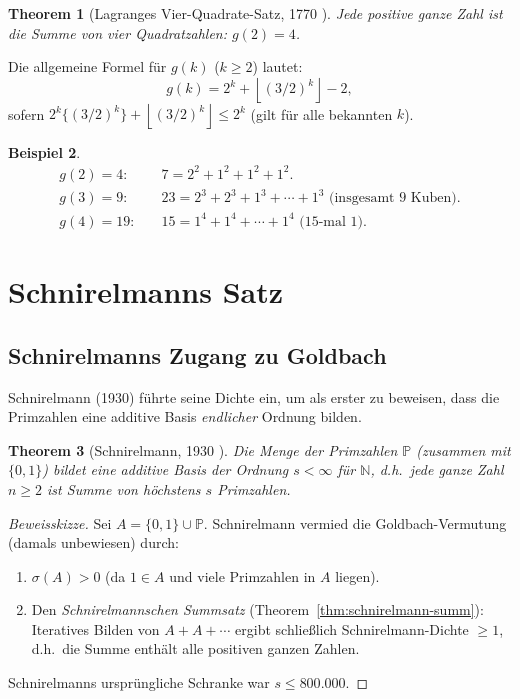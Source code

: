 \documentclass[12pt,a4paper]{amsart}
\newtheorem{theorem}{Theorem}[section]
\theoremstyle{definition}
\newtheorem{beispiel}[theorem]{Beispiel}
\newcommand{\N}{\mathbb{N}}
\newcommand{\floor}[1]{\left\lfloor #1 \right\rfloor}
\begin{document}
\begin{theorem}[Lagranges Vier-Quadrate-Satz, 1770 \cite{Lagrange1770}]
Jede positive ganze Zahl ist die Summe von vier Quadratzahlen:
$g(2) = 4$.
\end{theorem}

Die allgemeine Formel f\"{u}r $g(k)$ ($k \geq 2$) lautet:
\[
  g(k) = 2^k + \floor{(3/2)^k} - 2,
\]
sofern $2^k\{(3/2)^k\} + \floor{(3/2)^k} \leq 2^k$
(gilt f\"{u}r alle bekannten $k$).

\begin{beispiel}
\begin{align*}
  g(2) = 4: &\quad 7 = 2^2 + 1^2 + 1^2 + 1^2. \\
  g(3) = 9: &\quad 23 = 2^3 + 2^3 + 1^3 + \cdots + 1^3
                       \text{ (insgesamt 9 Kuben)}. \\
  g(4) = 19: &\quad 15 = 1^4 + 1^4 + \cdots + 1^4
                        \text{ (15-mal 1)}.
\end{align*}
\end{beispiel}

\section{Schnirelmanns Satz}\label{sec:schnirelmann}

\subsection{Schnirelmanns Zugang zu Goldbach}

Schnirelmann (1930) f\"{u}hrte seine Dichte ein, um als erster zu
beweisen, dass die Primzahlen eine additive Basis \emph{endlicher}
Ordnung bilden.

\begin{theorem}[Schnirelmann, 1930 \cite{Schnirelmann1930}]
\label{thm:schnirelmann}
Die Menge der Primzahlen $\mathbb{P}$ (zusammen mit $\{0, 1\}$) bildet
eine additive Basis der Ordnung $s < \infty$ f\"{u}r $\N$, d.h.\ jede
ganze Zahl $n \geq 2$ ist Summe von h\"{o}chstens $s$ Primzahlen.
\end{theorem}

\begin{proof}[Beweisskizze]
Sei $A = \{0, 1\} \cup \mathbb{P}$.  Schnirelmann vermied die
Goldbach-Vermutung (damals unbewiesen) durch:
\begin{enumerate}[label=(\arabic*)]
\item $\sigma(A) > 0$ (da $1 \in A$ und viele Primzahlen in $A$ liegen).
\item Den \emph{Schnirelmannschen Summsatz}
      (Theorem~\ref{thm:schnirelmann-summ}): Iteratives Bilden von
      $A + A + \cdots$ ergibt schlie\ss{}lich Schnirelmann-Dichte $\geq 1$,
      d.h.\ die Summe enth\"{a}lt alle positiven ganzen Zahlen.
\end{enumerate}
Schnirelmanns urspr\"{u}ngliche Schranke war $s \leq 800{.}000$.
\end{proof}
\end{document}

